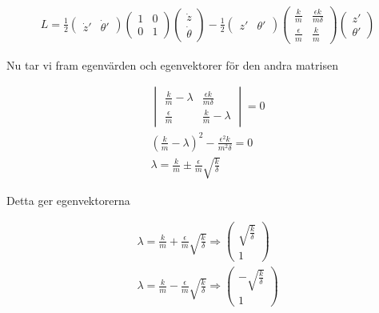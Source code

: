\documentclass[a4paper]{article}
\begin{document}
\begin{align*}
    L = \frac{1}{2} \begin{pmatrix} \dot{z}' & \dot{\theta}' \end{pmatrix} \begin{pmatrix} 1 & 0 \\ 0 & 1 \end{pmatrix} \begin{pmatrix} \dot{z} \\ \dot{\theta} \end{pmatrix} - \frac{1}{2} \begin{pmatrix} z' & \theta' \end{pmatrix} \begin{pmatrix} \frac{k}{m} & \frac{\epsilon k}{m \delta} \\ \frac{\epsilon}{m} & \frac{k}{m} \end{pmatrix} \begin{pmatrix} z' \\ \theta' \end{pmatrix}
\end{align*}

Nu tar vi fram egenvärden och egenvektorer för den andra matrisen

\begin{align*}
    \begin{vmatrix} \frac{k}{m} - \lambda & \frac{\epsilon k}{m \delta} \\ \frac{\epsilon}{m} & \frac{k}{m} - \lambda \end{vmatrix} = 0 \\
    \left ( \frac{k}{m} - \lambda \right )^2 - \frac{\epsilon^2 k}{m^2 \delta} = 0 \\
    \lambda = \frac{k}{m} \pm \frac{\epsilon}{m}\sqrt{\frac{k}{\delta}}
\end{align*}

Detta ger egenvektorerna

\begin{align*}
    \lambda = \frac{k}{m} + \frac{\epsilon}{m}\sqrt{\frac{k}{\delta}} \Rightarrow \begin{pmatrix} \sqrt{\frac{k}{\delta}} \\ 1 \end{pmatrix} \\
    \lambda = \frac{k}{m} - \frac{\epsilon}{m}\sqrt{\frac{k}{\delta}} \Rightarrow \begin{pmatrix} -\sqrt{\frac{k}{\delta}} \\ 1 \end{pmatrix}
\end{align*}
\end{document}
